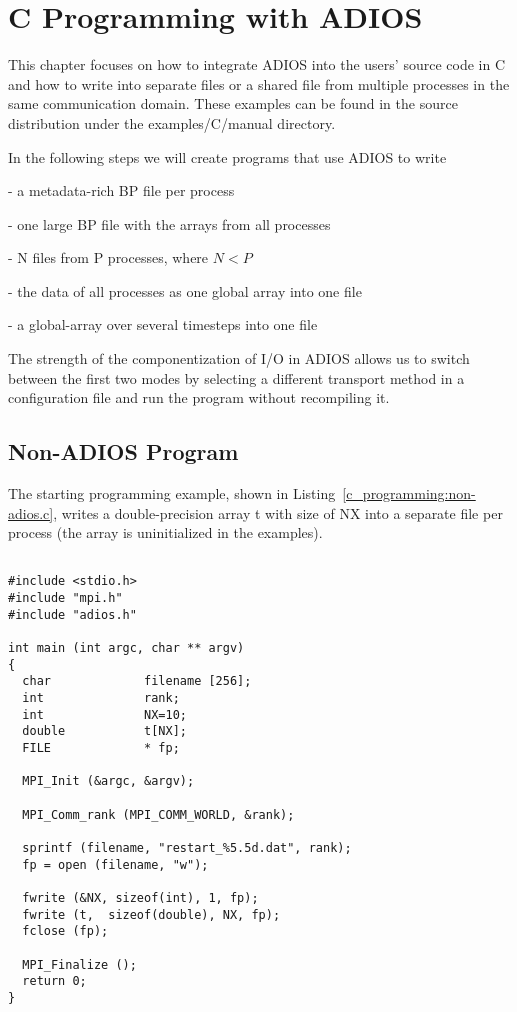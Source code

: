 \chapter{C Programming with ADIOS}

This chapter focuses on how to integrate ADIOS into the users' source code in C 
and how to write into separate files or a shared file from multiple processes in 
the same communication domain. These examples can be found in the source distribution 
under the examples/C/manual directory.

In the following steps we will create programs that use ADIOS to write

- a metadata-rich BP file per process

- one large BP file with the arrays from all processes

- N files from P processes, where $N<P$

- the data of all processes as one global array into one file

- a global-array over several timesteps into one file

The strength of the componentization of I/O in ADIOS allows us to switch between 
the first two modes by selecting a different transport method in a configuration 
file and run the program without recompiling it. 

\section{Non-ADIOS Program}

The starting programming example, shown in Listing~\ref{c_programming:non-adios.c}, writes a double-precision 
array t with size of NX into a separate file per process (the array is uninitialized 
in the examples). 

\begin{lstlisting}[alsolanguage=C,caption=Original program
  (examples/C/manual/1\_nonadios\_example.c]

#include <stdio.h>
#include "mpi.h"
#include "adios.h"

int main (int argc, char ** argv) 
{
  char             filename [256];
  int              rank;
  int              NX=10;
  double           t[NX];
  FILE             * fp;

  MPI_Init (&argc, &argv);

  MPI_Comm_rank (MPI_COMM_WORLD, &rank);

  sprintf (filename, "restart_%5.5d.dat", rank);
  fp = open (filename, "w");

  fwrite (&NX, sizeof(int), 1, fp);
  fwrite (t,  sizeof(double), NX, fp);
  fclose (fp);

  MPI_Finalize ();
  return 0;
}
\end{lstlisting}\label{c_programming:non-adios.c}

